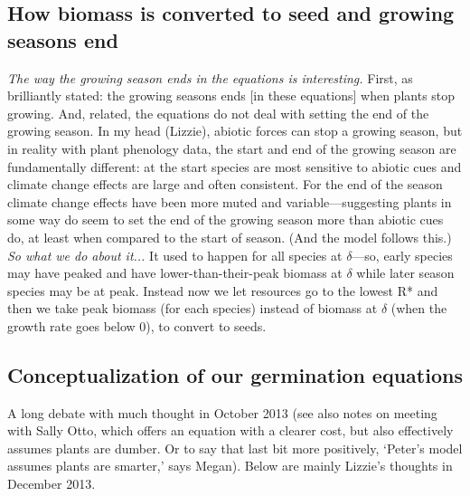 \documentclass[11pt,a4paper,oneside]{article}
\begin{document}
\subsection{How biomass is converted to seed and growing seasons end}

\noindent \emph{The way the growing season ends in the equations is
interesting.} First, as brilliantly stated: the growing seasons ends
[in these equations] when plants stop growing. And, related, the
equations do not deal with setting the end of the growing season. In
my head (Lizzie), abiotic forces can stop a growing season, but in
reality with plant phenology data, the start and end of the growing
season are fundamentally different: at the start species are most
sensitive to abiotic cues and climate change effects are large and
often consistent. For the end of the season climate change effects have been more
muted and variable---suggesting plants in some way do seem to set the
end of the growing season more than abiotic cues do, at least when
compared to the start of season. (And the model follows this.)\\

\noindent \emph{So what we do about it...} It used to happen for all species at $\delta$---so, early species may have peaked and have lower-than-their-peak biomass at $\delta$ while later season species may be at peak. Instead now we let resources go to  the lowest R* and then we take peak biomass (for each species) instead of biomass at $\delta$ (when the growth rate goes below 0), to convert to seeds.


\subsection{Conceptualization of our germination equations}
\noindent A long debate with much thought in October 2013 (see also notes on meeting with Sally Otto, which offers an equation with a clearer cost, but also effectively assumes plants are dumber. Or to say that last bit more positively, `Peter's model assumes plants are smarter,' says Megan). Below are mainly Lizzie's thoughts in December 2013. \\
\end{document}

